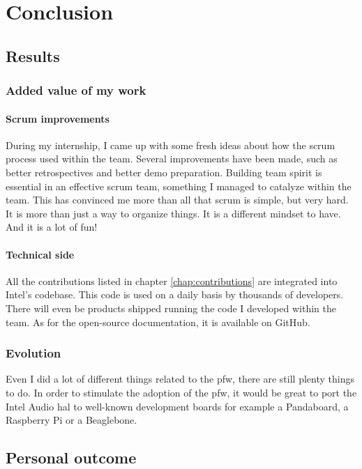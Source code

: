 \chapter{Conclusion}

\section{Results}

\subsection{Added value of my work}
\subsubsection{Scrum improvements}
During my internship, I came up with some fresh ideas about how the \gls{scrum} process used within the team.
Several improvements have been made, such as better retrospectives and better demo preparation.
Building team spirit is essential in an effective \gls{scrum} team, something I managed to catalyze within the team.
This has convinced me more than all that \gls{scrum} is simple, but very hard. It is more than just a way to organize
things. It is a different mindset to have. And it is a lot of fun!

\subsubsection{Technical side}
All the contributions listed in chapter \ref{chap:contributions} are integrated into Intel's codebase.
This code is used on a daily basis by thousands of developers. There will even be products shipped running the
code I developed within the team.
As for the open-source documentation, it is available on \gls{GitHub}.

\subsection{Evolution}
Even I did a lot of different things related to the \gls{pfw}, there are still plenty things to do.
In order to stimulate the adoption of the \gls{pfw}, it would be great to
port the Intel Audio \gls{hal} to well-known development boards for example a
Pandaboard, a Raspberry Pi or a Beaglebone.


\section{Personal outcome}

